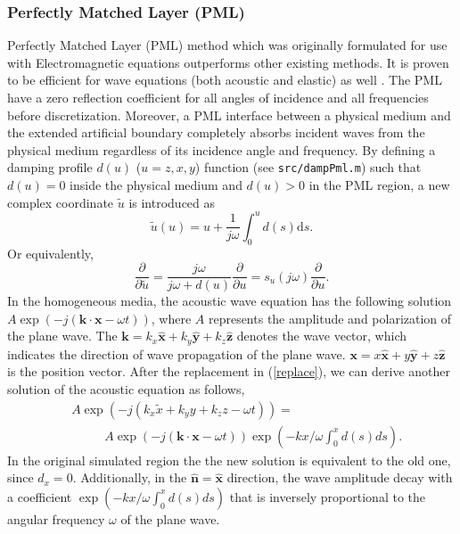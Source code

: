 \documentclass[12pt]{article}
\newcommand{\bx}{\boldsymbol{x}}
\newcommand{\bk}{\boldsymbol{k}}
\newcommand{\hx}{\hat{\mathbf{x}}}
\newcommand{\hy}{\hat{\mathbf{y}}}
\newcommand{\hz}{\hat{\mathbf{z}}}
\theoremstyle{plain}
\theoremstyle{definition}
\theoremstyle{remark}
\numberwithin{equation}{section}
\begin{document}
\subsubsection{Perfectly Matched Layer (PML)}
 Perfectly Matched Layer (PML) method which was originally formulated for use with Electromagnetic equations outperforms other existing methods. It is proven to be efficient for wave equations (both acoustic and elastic) as well \cite{KomMar2007}. The PML have a zero reflection coefficient for all angles of incidence and all frequencies before discretization. Moreover, a PML interface between a physical medium and the extended artificial boundary completely absorbs incident waves from the physical medium regardless of its incidence angle and frequency.
By defining a damping profile $d(u)$ ($u=z, x, y$) function (see \texttt{src/dampPml.m}) such that $d(u) = 0$ inside the physical medium and $d(u) > 0$ in the PML region, a new complex coordinate $\tilde{u}$ is introduced as
  \begin{equation}\label{replace}
  \tilde{u}(u) = u + \frac{1}{j\omega}\int_0^u d(s)\mathrm{d}s.
  \end{equation}
Or equivalently,
  \begin{equation}
  \frac{\partial}{\partial \tilde{u}} = \frac{j\omega}{j\omega + d(u)}\frac{\partial}{\partial u} = s_u(j\omega)\frac{\partial}{\partial u}.
  \end{equation}
In the homogeneous media, the acoustic wave equation has the following solution $A \exp(-j (\bk \cdot \bx -\omega t))$, where $A$ represents the amplitude and polarization of the plane wave. The $\bk = k_x \hx + k_y \hy +k_z \hz$ denotes the wave vector, which 
indicates the direction of wave propagation of the plane wave. $\bx = x\hx +y\hy +z \hz$ is the position vector. After the replacement in (\ref{replace}), we can derive another solution of the acoustic equation as follows,
\begin{equation}
\begin{aligned}
&A\exp(-j(k_x \tilde{x} + k_y y + k_z z -\omega t))=\\
 &~~~~~~~~~~~~A\exp(-j (\bk\cdot \bx -\omega t))\exp(-kx/\omega \int_0^x d(s)ds).
\end{aligned}
\end{equation}
In the original simulated region the the new solution is equivalent to the old one, since $d_x=0$. Additionally, in the $\hat{\mathbf{n}}= \hx$ direction, the wave amplitude decay with a coefficient $\exp(-kx/\omega \int_0^x d(s)ds)$ that is inversely proportional to the angular frequency $\omega$ of the plane wave. 
\end{document}
